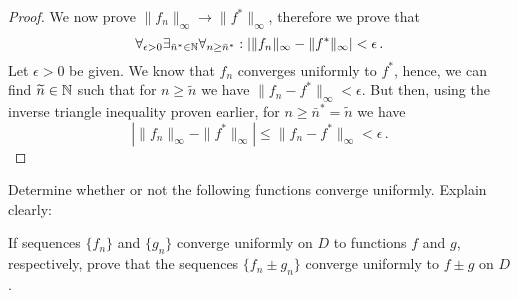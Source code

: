 \documentclass[week=5]{homework}
\begin{document}
\begin{questions}
\begin{parts}
\begin{proof}
				We now prove $\| f_n \|_\infty \to \| f^* \|_\infty$, therefore we prove that
				\[
					\forall_{\epsilon > 0}\exists_{\bar n^* \in \naturals}\forall_{n\geq \bar n^*}: |\|f_n\|_\infty - \|f^*\|_\infty| < \epsilon\,.
				\]
				Let $\epsilon > 0$ be given. We know that $f_n$ converges uniformly to $f^*$, hence, we can find $\widetilde n \in \mathbb{N}$ such that for $n \geq \widetilde n$ we have $\| f_n - f^* \|_\infty < \epsilon$. But then, using the inverse triangle inequality proven earlier, for $n \geq \bar n^* = \widetilde n$ we have
				\[
				|\|f_n\|_\infty - \|f^*\|_\infty| \leq \| f_n - f^* \|_\infty < \epsilon\,.
				\]
				
			\end{proof}
		\end{parts}
		
		\question
		Determine whether or not the following functions converge uniformly. Explain clearly:
		\begin{parts}
			\part $f_n : [0,1] \to \reals$ with $f_n(x) = \frac{x^n}{n}$
			\part $f_n : [1,1] \to \reals$ with $f_n(x) = \frac{nx}{1 + n^2x^2}$
			\part $f_n : [0,\infty) \to \reals$ with $f_n(x) = \frac{x^n}{1 + x^{2n}}$
			\part $f_n : \reals^+ \to \reals$ with $f_n(x) = \frac{1}{n} e^{-n^2x^2}$
			\part $f_n : [0,1] \to \reals$ with $f_n(x) = nxe^{-nx^2}$
			\part $f_n : [0,1] \to \reals$ with $f_n(x) = \frac{\sin(nx)}{\sqrt{n}}$
			\part $f_n : [0,\pi] \to \reals$ with $f_n(x) = (\sin x)^n$
			\part $f_n : [0,\infty) \to \reals$ with $f_n(x) = \frac{x}{n} \exp \left(- \frac{x}{n} \right)$
		\end{parts}
		
		\question
		If sequences $\{f_n \}$ and $\{g_n \}$ converge uniformly on $D$ to functions $f$ and $g$, respectively, prove that the sequences $\{f_n \pm g_n \}$ converge uniformly to $f \pm g$ on $D$.
     \end{questions}
\end{document}
